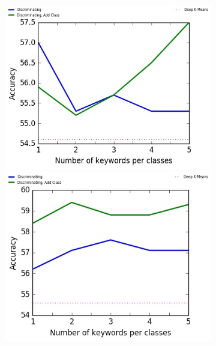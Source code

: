 \begin{figure}[!h]
\begin{subfigure}[b]{\textwidth}
\begin{minipage}{0.5\linewidth}
\centering
  \includegraphics[scale=0.49]{parts/res/dat_file/acc/20NEWS.jpg}     
\end{minipage}
  \begin{minipage}{0.5\linewidth}
\centering
   \includegraphics[scale=0.49]{parts/res/dat_file/acc/20NEWS_simple.jpg}     
\end{minipage}
\end{subfigure}
\begin{subfigure}[b]{\textwidth}

\end{subfigure}
\end{figure}
